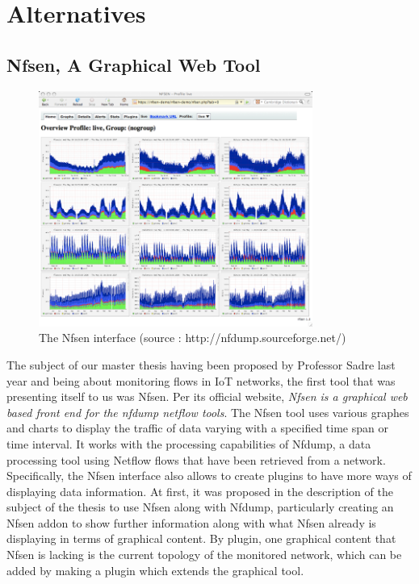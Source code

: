 \chapter{Alternatives}

\section{Nfsen, A Graphical Web Tool}
\begin{figure}[!h]
	\centering
	\includegraphics[width=0.8\textwidth]{res/nfsen.png}
	\caption{The Nfsen interface (source : http://nfdump.sourceforge.net/)}
	\label{fig:nfdump}
\end{figure}

The subject of our master thesis having been proposed by Professor Sadre last year and being about monitoring flows in IoT networks, the first tool that was presenting itself to us was Nfsen. Per its official website, \textit{Nfsen is a graphical web based front end for the nfdump netflow tools}. The Nfsen tool uses various graphes and charts to display the traffic of data varying with a specified time span or time interval. It works with the processing capabilities of Nfdump, a data processing tool using Netflow flows that have been retrieved from a network. Specifically, the Nfsen interface also allows to create plugins to have more ways of displaying data information. At first, it was proposed in the description of the subject of the thesis to use Nfsen along with Nfdump, particularly creating an Nfsen addon to show further information along with what Nfsen already is displaying in terms of graphical content. By plugin, one graphical content that Nfsen is lacking is the current topology of the monitored network, which can be added by making a plugin which extends the graphical tool.\\

